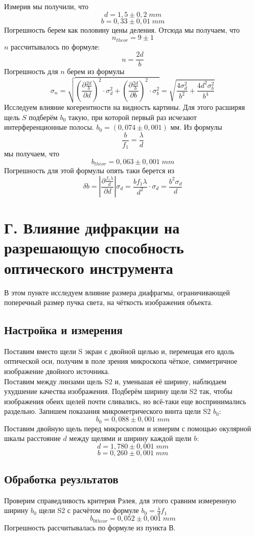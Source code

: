 \documentclass[a4paper]{article}
\begin{document}
	Измерив мы получили, что 
	$$d = 1,5 \pm 0,2 \; mm$$
	$$b = 0,33 \pm 0,01 \; mm$$
	Погрешность берем как половину цены деления.
	Отсюда мы получаем, что
	$$n_{theor} = 9 \pm 1$$
$n$ рассчитывалось по формуле:
$$ n = \frac{2d}{b}$$
	Погрешность для $n$ берем из формулы 
	$$\sigma_n =\sqrt{\left(\frac{\partial \frac{2d}{b}}{\partial d}\right)^{2} \cdot \sigma_{d}^2 + \left(\frac{\partial \frac{2d}{b}}{\partial b}\right)^{2} \cdot \sigma_{b}^2} = \sqrt{\frac{4\sigma_d^2}{b^2} + \frac{4d^2\sigma_{b}^2}{b^4}}$$
Исследуем влияние когерентности на видность картины. Для этого расширяя щель $S$ подберём $b_0$ такую, при которой первый раз исчезают интерференционные полосы. $b_{0} = (0,074 \pm 0,001)$ мм. Из формулы 
	$$\frac{b}{f_1} = \frac{\lambda}{d}$$
	мы получаем, что 
	$$b_{theor} = 0,063 \pm 0,001 \; mm$$
	Погрешность для этой формулы опять таки берется из
	$$\delta b = \left|\frac{\partial \frac{f_1 \lambda}{d}}{\partial d}\right| \sigma_d = \frac{b f_1 \lambda}{d^2} \cdot \sigma_d = \frac{b^2\sigma_d}{d}$$

\section{Г. Влияние дифракции на разрешающую способность оптического инструмента}
В этом пункте исследуем влияние размера диафрагмы, ограничивающей поперечный размер пучка света, на чёткость изображения объекта.\\
\subsection*{Настройка и измерения}
Поставим вместо щели S экран с двойной щелью и, перемещая его вдоль оптической оси, получим в поле зрения микроскопа чёткое, симметричное изображение двойного источника.\\
Поставим между линзами щель S2 и, уменьшая её ширину, наблюдаем ухудшение качества изображения. Подберём ширину щели S2 так, чтобы изображения обеих щелей почти сливались, но всё-таки еще воспринимались раздельно. Запишем показания микрометрического винта щели S2 $b_0$:\\
$$b_0 = 0,088 \pm 0,001 \; mm$$
Поставим двойную щель перед микроскопом и измерим с помощью окулярной шкалы расстояние $d$ между щелями и ширину каждой щели $b$:
$$d = 1,780\pm 0,001 \; mm$$
$$b = 0,260 \pm 0,001 \; mm$$
\subsection*{Обработка реузльтатов}
Проверим справедливость критерия Рэлея, для этого сравним измеренную ширину $b_0$ щели S2 с расчётом по формуле $b_0 = \frac{\lambda}{d}f_1$\\
$$b_{0theor} = 0,052 \pm 0,001 \; mm$$
Погрешность рассчитывалась по формуле из пункта В.
\end{document}
